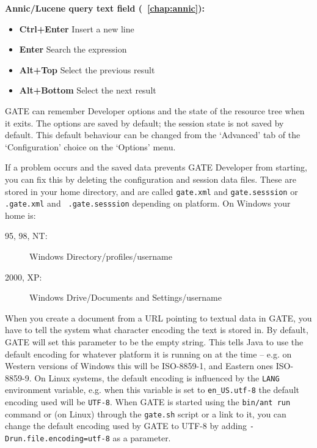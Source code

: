 {\bf Annic/Lucene query text field (\Chapthing~\ref{chap:annic}):}

\begin{itemize}
\item {\bf Ctrl+Enter} Insert a new line
\item {\bf Enter} Search the expression
\item {\bf Alt+Top} Select the previous result
\item {\bf Alt+Bottom} Select the next result
\end{itemize}




GATE can remember Developer options and the state of the resource tree when it
exits. The options are saved by default; the session state is not saved by
default. This default behaviour can be changed from the `Advanced' tab of
the `Configuration' choice on the `Options' menu.

If a problem occurs and the saved data prevents GATE Developer from
starting, you can fix this by deleting the configuration and session
data files. These are stored in your home directory, and are called
{\tt gate.xml} and {\tt gate.sesssion} or {\tt .gate.xml} and {\tt
.gate.sesssion} depending on platform.  On Windows your home is:
\begin{description}
\item[95, 98, NT:] Windows Directory/profiles/username
\item[2000, XP:] Windows Drive/Documents and Settings/username
\end{description}



When you create a document from a URL pointing to textual data
in GATE, you have to tell the system what character encoding the text is
stored in. By default, GATE will set this parameter to be the empty string.
This tells Java to use the default encoding for whatever platform it is
running on at the time -- e.g. on Western versions of Windows this will be
ISO-8859-1, and Eastern ones ISO-8859-9. On Linux systems, the default 
encoding is influenced by the \texttt{LANG} environment variable, e.g.
when this variable is set to \texttt{en\_US.utf-8} the default encoding used
will be \texttt{UTF-8}. When GATE is started using the \texttt{bin/ant run} 
command or (on Linux) through the \texttt{gate.sh} script or a link to it,
you can change the default encoding used by GATE to UTF-8 by adding 
\texttt{-Drun.file.encoding=utf-8} as a parameter.

